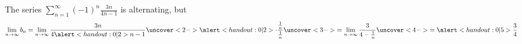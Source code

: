 \begin{frame}
\begin{example}[Example 2, p. 747]
The series $\sum_{n=1}^\infty (-1)^n \frac{3n}{4n-1}$ is alternating, but
\[
\lim_{n\to\infty} b_n = \lim_{n\to\infty} \frac{3n}{4\alert<handout:0| 2>{n}-1}\uncover<2->{\alert<handout:0| 2>{\cdot \frac{\frac{1}{n}}{\frac{1}{n}}}}%
\uncover<3->{%
 = \lim_{n\to\infty} \frac{3}{4-\frac{1}{n}}%
}%
\uncover<4->{%
 = \alert<handout:0| 5>{\frac{3}{4}}%
}%
\]
\end{example}
\end{frame}

